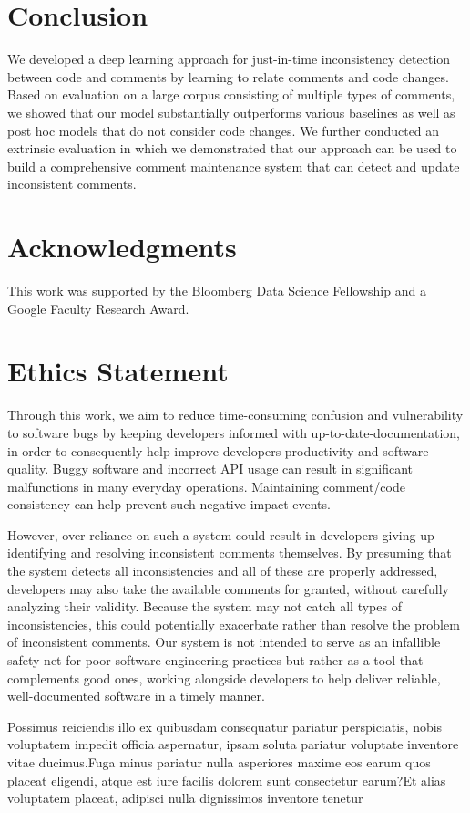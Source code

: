 \documentclass[letterpaper]{article} %
\newcommand{\Posthoc}{post hoc}
\newcommand{\JustInTime}{just-in-time}
\begin{document}
\section{Conclusion}
We developed a deep learning approach for \JustInTime{} inconsistency detection between code and comments by learning to relate comments and code changes. Based on evaluation on a large corpus consisting of multiple types of comments, we showed that our model substantially  outperforms various baselines as well as \Posthoc{} models that do not consider code changes. We further conducted an extrinsic evaluation in which we demonstrated that our approach can be used to build a comprehensive comment maintenance system that can detect and update inconsistent comments.


\section*{Acknowledgments}
This work was supported by the Bloomberg Data Science Fellowship and a Google Faculty Research Award.


\section*{Ethics Statement}
Through this work, we aim to reduce time-consuming confusion and vulnerability to software bugs by keeping developers informed with up-to-date-documentation, in order to consequently help improve developers productivity and software quality. Buggy software and incorrect API usage can result in significant malfunctions in many everyday operations. Maintaining comment/code consistency can help prevent such negative-impact events.

However, over-reliance on such a system could result in developers giving up identifying and resolving inconsistent comments themselves. By presuming that the system detects all inconsistencies and all of these are properly addressed, developers may also take the available comments for granted, without carefully analyzing their validity. Because the system may not catch all types of inconsistencies, this could potentially exacerbate rather than resolve the problem of inconsistent comments. Our system is not intended to serve as an infallible safety net for poor software engineering practices but rather as a tool that complements good ones, working alongside developers to help deliver reliable, well-documented software in a timely manner.



\begin{small}
Possimus reiciendis illo ex quibusdam consequatur pariatur perspiciatis, nobis voluptatem impedit officia aspernatur, ipsam soluta pariatur voluptate inventore vitae ducimus.Fuga minus pariatur nulla asperiores maxime eos earum quos placeat eligendi, atque est iure facilis dolorem sunt consectetur earum?Et alias voluptatem placeat, adipisci nulla dignissimos inventore tenetur

\end{small}
\end{document}
